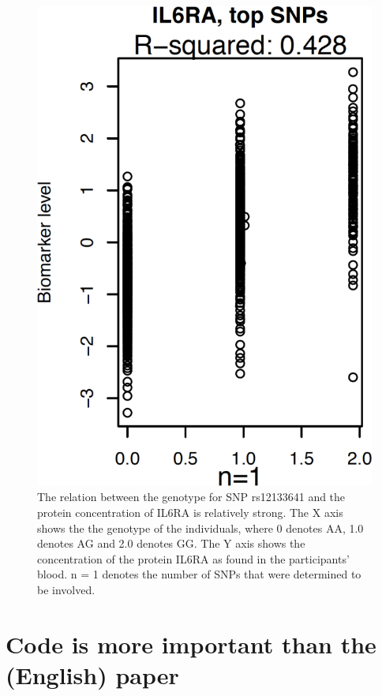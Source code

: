 \begin{figure}[!htbp]
  \centering
  \includegraphics[width=\linewidth]{ahsan2017relative_s6.png}
  \caption{
    The relation between the genotype for SNP rs12133641 
    and the protein concentration of IL6RA is relatively strong.
    The X axis shows the the genotype of the individuals,
    where 0 denotes AA, 1.0 denotes AG and 2.0 denotes GG.
    The Y axis shows the concentration of the protein IL6RA 
    as found in the participants' blood. n = 1 denotes the number
    of SNPs that were determined to be involved.
  }
  \label{fig:ahsan2017relative_s6}
\end{figure}

\section{Code is more important than the (English) paper}

